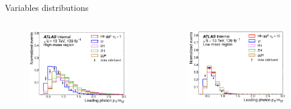 \begin{frame}{Variables distributions}
\begin{columns}
\begin{figure}
    \centering
    \includegraphics[width=1.\textwidth]{BackUp/Part3/Img/var_SM_rel_photon1_pt.pdf}
\end{figure}
\begin{figure}
    \centering
    \includegraphics[width=1.\textwidth]{BackUp/Part3/Img/var_BSM_rel_photon1_pt.pdf}
\end{figure}
\end{columns}
\end{frame}

